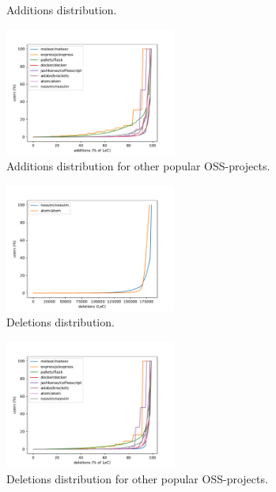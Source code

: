 \documentclass[a4paper,11pt]{article}
\begin{document}
{\begin{figure}[!h]
	\caption{Additions distribution.}
	\label{fig:additions_dist}
\end{figure}
\begin{figure}[!h]
	\centering
	\includegraphics[width=0.5\textwidth]{all_additions_dist}
	\caption{Additions distribution for other popular OSS-projects.}
	\label{fig:all_additions_dist}
\end{figure}
\begin{figure}[!h]
	\centering
	\includegraphics[width=0.5\textwidth]{deletions_dist}
	\caption{Deletions distribution.}
	\label{fig:deletions_dist}
\end{figure}
\begin{figure}[!h]
	\centering
	\includegraphics[width=0.5\textwidth]{all_deletions_dist}
	\caption{Deletions distribution for other popular OSS-projects.}
	\label{fig:all_deletions_dist}
\end{figure}

\FloatBarrier
}
\end{document}
